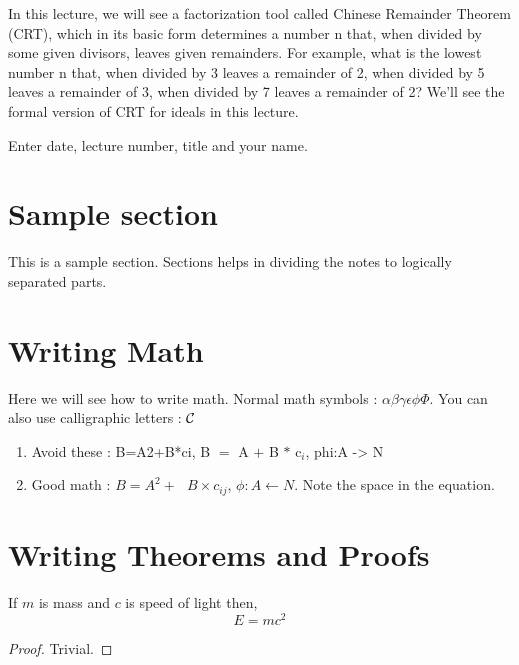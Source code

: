 In this lecture, we will see a factorization tool called Chinese Remainder Theorem (CRT), which in its basic form determines a number n that, when divided by some given divisors, leaves given remainders. For example, what is the lowest number n that, when divided by 3 leaves a remainder of 2, when divided by 5 leaves a remainder of 3, when divided by 7 leaves a remainder of 2? We'll see the formal version of CRT for ideals in this lecture.

\begin{note}
	Enter date, lecture number, title and your name. 
\end{note}

\section{Sample section}
This is a sample section. Sections helps in dividing the notes to logically separated parts.


\section{Writing Math}
Here we will see how to write math. Normal math symbols : 
$\alpha\beta\gamma\epsilon\phi\Phi $. You can also use calligraphic letters : ${\cal C}$
\begin{enumerate}
\item Avoid these : B=A2+B*ci, B $=$ A $+$ B $*$ c$_i$, phi:A -> N
\item Good math : $B=A^2 +~~~B \times c_{ij}$, $\phi: A \leftarrow N$. Note the space in the equation.
\end{enumerate}



\section{Writing Theorems and Proofs} \label{sec:rel}
\begin{theorem} \label{cl:relativity}
If $m$ is mass and $c$ is speed of light then, 
\begin{equation} \label{eq:relativity}
E = mc^2
\end{equation}

\end{theorem}
\begin{proof}
Trivial. 
\end{proof}

